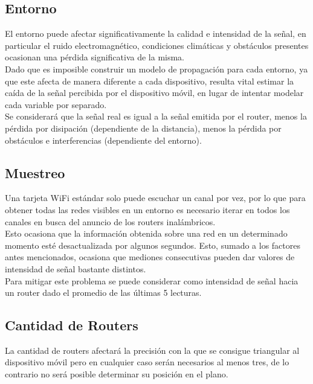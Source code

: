 \documentclass[journal]{IEEEtran}
\begin{document}
\subsection{Entorno}

El entorno puede afectar significativamente la calidad e intensidad de la señal, en particular el ruido electromagnético, condiciones climáticas y obstáculos presentes ocasionan una pérdida significativa de la misma.\\

Dado que es imposible construir un modelo de propagación para cada entorno, ya que este afecta de manera diferente a cada dispositivo, resulta vital estimar la caída de la señal percibida por el dispositivo móvil, en lugar de intentar modelar cada variable por separado.\\

Se considerará que la señal real es igual a la señal emitida por el router, menos la pérdida por disipación (dependiente de la distancia), menos la pérdida por obstáculos e interferencias (dependiente del entorno).\\

\subsection{Muestreo}

Una tarjeta WiFi estándar solo puede escuchar un canal por vez, por lo que para obtener todas las redes visibles en un entorno es necesario iterar en todos los canales en busca del anuncio de los routers inalámbricos.\\

Esto ocasiona que la información obtenida sobre una red en un determinado momento esté desactualizada por algunos segundos. Esto, sumado a los factores antes mencionados, ocasiona que mediones consecutivas pueden dar valores de intensidad de señal bastante distintos.\\

Para mitigar este problema se puede considerar como intensidad de señal hacia un router dado el promedio de las últimas 5 lecturas.\\

\subsection{Cantidad de Routers}

La cantidad de routers afectará la precisión con la que se consigue triangular al dispositivo móvil pero en cualquier caso serán necesarios al menos tres, de lo contrario no será posible determinar su posición en el plano.\\
\end{document}
